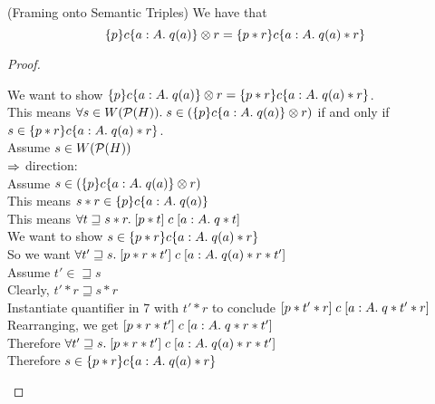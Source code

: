\begin{lemma}{(Framing onto Semantic Triples)}
We have that 
\begin{displaymath}
\{{p}\}{c}\{{a:A}.\;{q(a)}\} \otimes r = \{{p * r}\}{c}\{{a:A}.\;{q(a) * r}\}  
\end{displaymath}
\end{lemma}

\begin{proof}
\begin{tabbedproof}
\oo We want to show $\{{p}\}{c}\{{a:A}.\;{q(a)}\} \otimes r = \{{p * r}\}{c}\{{a:A}.\;{q(a) * r}\}$. \\
\oo This means $\forall s \in W(\mathcal{P}(H)).\; s \in (\{{p}\}{c}\{{a:A}.\;{q(a)}\} \otimes r)$ if and
only if $s \in \{{p * r}\}{c}\{{a:A}.\;{q(a) * r}\}$. \\
\ooo Assume $s \in W(\mathcal{P}(H))$ \\
\oooo $\Rightarrow$ direction: \\
\ooooo Assume $s \in (\{{p}\}{c}\{{a:A}.\;{q(a)}\} \otimes r)$ \\
\oooooo This means $s * r \in \{{p}\}{c}\{{a:A}.\;{q(a)}\}$ \\
\oooooo This means $\forall t \sqsupseteq s * r.\; [{p * t}]\;{c}\;[{a:A}.\;{q * t}]$ \\
\oooooo We want to show $s \in \{{p * r}\}{c}\{{a:A}.\;{q(a) * r}\}$ \\
\oooooo So we want $\forall t' \sqsupseteq s.\; [{p * r * t'}]\;{c}\;[{a:A}.\;{q(a) * r * t'}]$\\
\oooooo Assume $t' \in \sqsupseteq s$ \\
\ooooooo Clearly, $t' * r \sqsupseteq s * r$ \\
\ooooooo Instantiate quantifier in 7 with $t' * r$ to conclude
         $[{p * t' * r}]\;{c}\;[{a:A}.\;{q * t' * r}]$ \\
\ooooooo Rearranging, we get $[{p * r * t'}]\;{c}\;[{a:A}.\;{q * r * t'}]$ \\
\oooooo Therefore $\forall t' \sqsupseteq s.\; [{p * r * t'}]\;{c}\;[{a:A}.\;{q(a) * r * t'}]$\\
\oooooo Therefore $s \in \{{p * r}\}{c}\{{a:A}.\;{q(a) * r}\}$ \\[0.5em]


\end{tabbedproof}
\end{proof}
